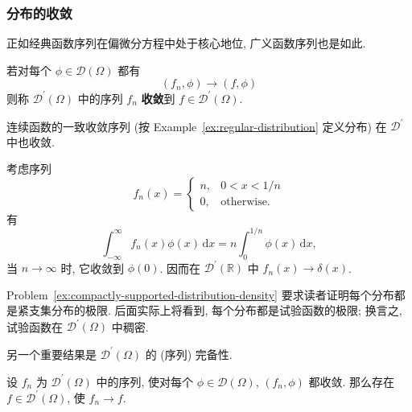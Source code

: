 \subsubsection{分布的收敛}\label{subsec:distribution-convergence}

正如经典函数序列在偏微分方程中处于核心地位, 广义函数序列也是如此.

\begin{Definition}
\label{def:distribution-convergence}
若对每个 $\phi\in\mathcal{D}(\Omega)$ 都有 \[(f_n,\phi)\to(f,\phi)\] 则称 $\mathcal{D}^{\prime}(\Omega)$ 中的序列 $f_n$ \textbf{收敛}到 $f\in\mathcal{D}^{\prime}(\Omega)$.
\end{Definition}

\begin{Example}
\label{ex:uniform-convergence-distribution}
连续函数的一致收敛序列 (按 Example~\ref{ex:regular-distribution} 定义分布) 在 $\mathcal{D}^{\prime}$ 中也收敛.
\end{Example}

\begin{Example}
\label{ex:delta-rectangular-approximation}
考虑序列
\begin{equation}\label{eq:delta-approximating-rectangular-sequence}
f_n(x)=\begin{cases}n,&0<x<1/n\\0,&\text{otherwise.}\end{cases}
\end{equation}
有
\begin{equation}\label{eq:delta-rectangular-sequence-pairing}
\int_{-\infty}^{\infty}f_n(x)\phi(x)\,\mathrm{d}x=n\int_0^{1/n}\phi(x)\,\mathrm{d}x,
\end{equation}
当 $n\to\infty$ 时, 它收敛到 $\phi(0)$. 因而在 $\mathcal{D}^{\prime}(\mathbb{R})$ 中 $f_n(x)\to\delta(x)$.
\end{Example}

\begin{Remark}
\label{rem:distribution-density}
Problem~\ref{ex:compactly-supported-distribution-density} 要求读者证明每个分布都是紧支集分布的极限. 后面实际上将看到, 每个分布都是试验函数的极限; 换言之, 试验函数在 $\mathcal{D}^{\prime}(\Omega)$ 中稠密.
\end{Remark}

另一个重要结果是 $\mathcal{D}^{\prime}(\Omega)$ 的 (序列) 完备性.

\begin{Theorem}
\label{thm:distribution-sequential-completeness}
设 $f_n$ 为 $\mathcal{D}^{\prime}(\Omega)$ 中的序列, 使对每个 $\phi\in\mathcal{D}(\Omega)$, $(f_n,\phi)$ 都收敛. 那么存在 $f\in\mathcal{D}^{\prime}(\Omega)$, 使 $f_n\to f$.
\end{Theorem}

